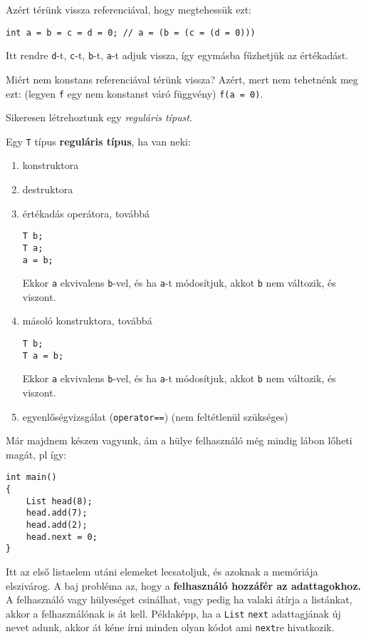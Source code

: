 \documentclass[a4paper,11.5pt]{article}
\begin{document}
	Azért térünk vissza referenciával, hogy megtehessük ezt:
	\begin{lstlisting}
int a = b = c = d = 0; // a = (b = (c = (d = 0)))
	\end{lstlisting}
	Itt rendre \texttt{d}-t, \texttt{c}-t, \texttt{b}-t, \texttt{a}-t adjuk vissza, így egymásba fűzhetjük az értékadást.
	\begin{note}
		Miért nem konstans referenciával térünk vissza? Azért, mert nem tehetnénk meg ezt: (legyen \texttt{f} egy nem konstanst váró függvény) \texttt{f(a = 0)}.
	\end{note}
	Sikeresen létrehoztunk egy \textit{reguláris típust}.
	\begin{definition}
		Egy \texttt{T} típus \textbf{reguláris típus}, ha van neki:
		\begin{enumerate}
			\item konstruktora
			\item destruktora
			\item értékadás operátora, továbbá
			\begin{lstlisting}
T b;
T a;
a = b;
			\end{lstlisting}
			Ekkor \texttt{a} ekvivalens \texttt{b}-vel, és ha \texttt{a}-t módosítjuk, akkot \texttt{b} nem változik, és viszont.
			\item másoló konstruktora, továbbá
			\begin{lstlisting}
T b;
T a = b;
			\end{lstlisting}
			Ekkor \texttt{a} ekvivalens \texttt{b}-vel, és ha \texttt{a}-t módosítjuk, akkot \texttt{b} nem változik, és viszont.
			\item egyenlőségvizsgálat (\texttt{operator==}) (nem feltétlenül szükséges)
		\end{enumerate}
	\end{definition}
	Már majdnem készen vagyunk, ám a hülye felhasználó még mindig lábon lőheti magát, pl így:
	\begin{lstlisting}
int main()
{
	List head(8);
	head.add(7);
	head.add(2);
	head.next = 0;
}
	\end{lstlisting}
	Itt az első listaelem utáni elemeket lecsatoljuk, és azoknak a memóriája elszivárog. A baj probléma az, hogy a \textbf{felhasználó hozzáfér az adattagokhoz.} A felhasználó vagy hülyeséget csinálhat, vagy pedig ha valaki átírja a listánkat, akkor a felhasználónak is át kell. Példaképp, ha a \texttt{List} \texttt{next} adattagjának új nevet adunk, akkor át kéne írni minden olyan kódot ami \texttt{next}re hivatkozik.
	
\end{document}
